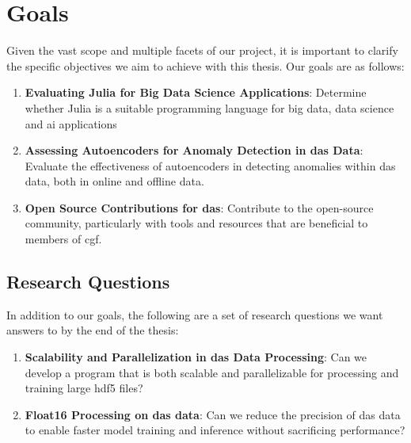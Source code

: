 \section{Goals}

Given the vast scope and multiple facets of our project, it is important to clarify the specific objectives we aim to achieve with this thesis. Our goals are as follows:

\begin{enumerate}
    \item \textbf{Evaluating Julia for Big Data Science Applications}: Determine whether Julia is a suitable programming language for big data, data science and \acrshort{ai} applications
    \item \textbf{Assessing Autoencoders for Anomaly Detection in \acrshort{das} Data}: Evaluate the effectiveness of autoencoders in detecting anomalies within \acrshort{das} data, both in online and offline data.
    \item \textbf{Open Source Contributions for \acrshort{das}}: Contribute to the open-source community, particularly with tools and resources that are beneficial to members of \acrshort{cgf}.
\end{enumerate}


\subsection{Research Questions}

In addition to our goals, the following are a set of research questions we want answers to by the end of the thesis:

\begin{enumerate}
    \item \textbf{Scalability and Parallelization in \acrshort{das} Data Processing}: Can we develop a program that is both scalable and parallelizable for processing and training large \acrshort{hdf5} files?
    \item \textbf{Float16 Processing on \acrshort{das} data}: Can we reduce the precision of \acrshort{das} data to enable faster model training and inference without sacrificing performance?
\end{enumerate}
